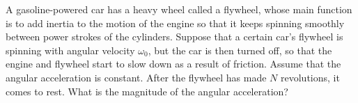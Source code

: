 A gasoline-powered car has a heavy wheel called a flywheel, whose main function
is to add inertia to the motion of the engine so that it keeps spinning smoothly
between power strokes of the cylinders.
Suppose that a certain car's flywheel is spinning with
angular velocity $\omega_0$, but the car is then turned off, so that the
engine and flywheel start to slow down as a result of friction. Assume that the
angular acceleration is constant. After the flywheel
has made $N$ revolutions, it comes to rest. What is the magnitude of
the angular acceleration?\answercheck
